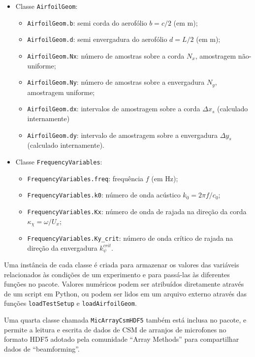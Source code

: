 \documentclass[a4paper, 11pt, twoside]{article}
\begin{document}
\begin{itemize}
	\item Classe \verb|AirfoilGeom|:
	\begin{itemize}
		\item \verb|AirfoilGeom.b|: semi corda do aerofólio $b = c/2$ (em m);
		\item \verb|AirfoilGeom.d|: semi envergadura do aerofólio $d = L/2$ (em m);
		\item \verb|AirfoilGeom.Nx|: número de amostras sobre a corda $N_x$, amostragem não-uniforme;
		\item \verb|AirfoilGeom.Ny|: número de amostras sobre a envergadura $N_y$, amostragem uniforme;
		\item \verb|AirfoilGeom.dx|: intervalos de amostragem sobre a corda $\Delta x_s$  (calculado internamente)
		\item \verb|AirfoilGeom.dy|: intervalo de amostragem sobre a envergadura $\Delta y_s$  (calculado internamente).
	\end{itemize}
	
	\item Classe \verb|FrequencyVariables|:
	\begin{itemize}
		\item \verb|FrequencyVariables.freq|: frequência $f$ (em Hz);
		\item \verb|FrequencyVariables.k0|: número de onda acústico $k_0 = 2 \pi f/c_0$;
		\item \verb|FrequencyVariables.Kx|: número de onda de rajada na direção da corda $\kappa_\chi = \omega/U_x$;
		\item \verb|FrequencyVariables.Ky_crit|: número de onda crítico de rajada na direção da envergadura $k_\psi^{crit}$.
	\end{itemize}
\end{itemize}

Uma instância de cada classe é criada para armazenar os valores das variáveis relacionados às condições de um experimento e para passá-las às diferentes funções no pacote. Valores numéricos podem ser atribuídos diretamente através de um script em Python, ou podem ser lidos em um arquivo externo através das funções \verb|loadTestSetup| e \verb|loadAirfoilGeom|. 

Uma quarta classe chamada \verb|MicArrayCsmHDF5| também está inclusa no pacote, e permite a leitura e escrita de dados de CSM de arranjos de microfones no formato HDF5 adotado pela comunidade ``Array Methods'' \cite{Bahr_etal2017, Sarradj_etal2017} para compartilhar dados de ``beamforming''.

\clearpage
\newpage
\label{Bibliography}
 
 
\end{document}
